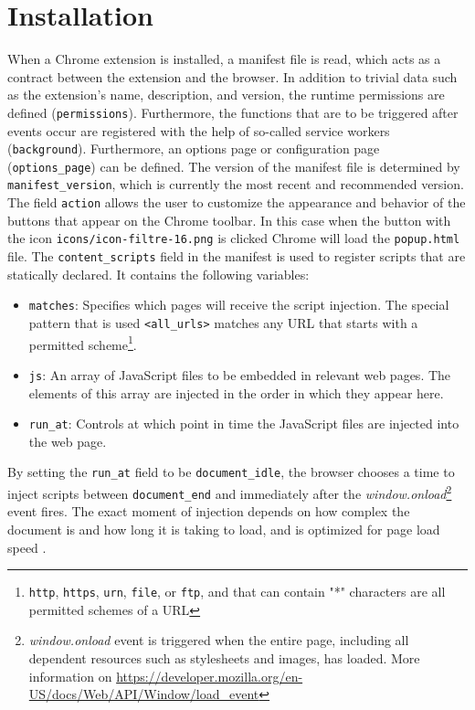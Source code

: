 \section{Installation}
When a Chrome extension is installed, a manifest file is read, which acts as a contract between the extension and the browser. In addition to trivial data such as the extension's name, description, and version, the runtime permissions are defined (\texttt{permissions}). Furthermore, the functions that are to be triggered after events occur are registered with the help of so-called service workers (\texttt{background}). Furthermore, an options page or configuration page (\verb;options_page;) can be defined. The version of the manifest file is determined by \verb;manifest_version;, which is currently the most recent and recommended version. The field \texttt{action} allows the user to customize the appearance and behavior of the buttons that appear on the Chrome toolbar. In this case when the button with the icon \texttt{icons/icon-filtre-16.png} is clicked Chrome will load the \texttt{popup.html} file. The \verb;content_scripts; field in the manifest is used to register scripts that are statically declared. It contains the following variables:

\begin{itemize}
  \item \texttt{matches}: Specifies which pages will receive the script injection. The special pattern that is used \verb;<all_urls>; matches any URL that starts with a permitted scheme\footnote{\texttt{http}, \texttt{https}, \texttt{urn}, \texttt{file}, or \texttt{ftp}, and that can contain "*" characters are all permitted schemes of a URL}.
  \item \texttt{js}: An array of JavaScript files to be embedded in relevant web pages. The elements of this array are injected in the order in which they appear here.
  \item \verb;run_at;: Controls at which point in time the JavaScript files are injected into the web page.
\end{itemize}

By setting the \verb;run_at; field to be \verb;document_idle;, the browser chooses a time to inject scripts between \verb;document_end; and immediately after the \emph{window.onload}\footnote{\emph{window.onload} event is triggered when the entire page, including all dependent resources such as stylesheets and images, has loaded. More information on \url{https://developer.mozilla.org/en-US/docs/Web/API/Window/load_event}} event fires. The exact moment of injection depends on how complex the document is and how long it is taking to load, and is optimized for page load speed \autocite{chrome2021runtime}.

